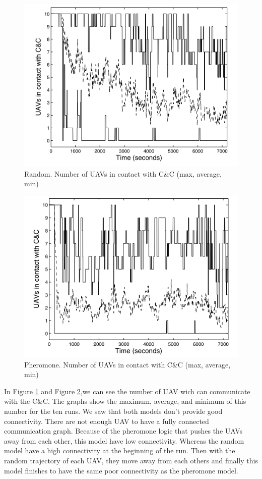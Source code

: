 \begin{figure}[!h]
\caption{\label{randomconnect} Random. Number of UAVs in contact with C\&C (max, average, min)}
   \includegraphics{../images/random_resultat_connectivite.png}
\end{figure}

\newpage

\begin{figure}[!h]
\caption{\label{pheromoneconnect}Pheromone. Number of UAVs in contact with C\&C (max, average, min)}
   \includegraphics{../images/pheromone_resultat_connectivite.png}
\end{figure}

In Figure \ref{randomconnect} and Figure \ref{pheromoneconnect},we can see the number of UAV wich can communicate with the C\&C.  The  graphs  show the maximum, average, and minimum of this number for the ten runs. We saw that both models don't provide good connectivity. There are not enough UAV to have a fully connected communication graph. Because of the pheromone logic that pushes the UAVs away from each other, this model have low connectivity. Whereas the random model have a high connectivity at the beginning of the run. Then with the random trajectory of each UAV, they move away from each others and finally this model finishes to have the same poor connectivity as the pheromone model.
